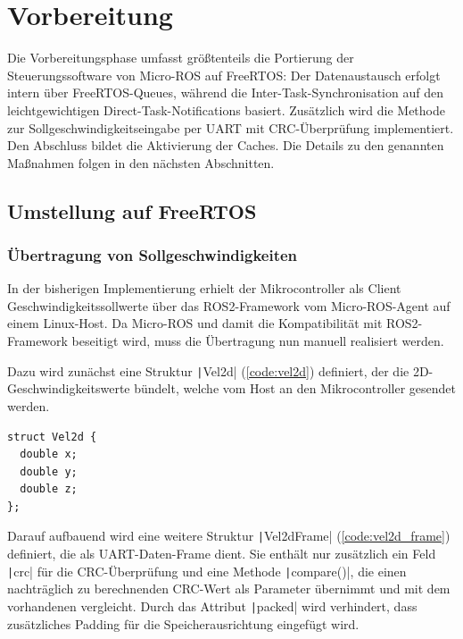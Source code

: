 \section{Vorbereitung}

Die Vorbereitungsphase umfasst größtenteils die Portierung der
Steuerungssoftware von Micro-ROS auf FreeRTOS: Der Datenaustausch erfolgt intern
über FreeRTOS-Queues, während die Inter-Task-Synchronisation auf den
leichtgewichtigen Direct-Task-Notifications basiert. Zusätzlich wird die Methode
zur Sollgeschwindigkeitseingabe per UART mit CRC-Überprüfung implementiert. Den
Abschluss bildet die Aktivierung der Caches. Die Details zu den genannten
Maßnahmen folgen in den nächsten Abschnitten.

\subsection{Umstellung auf FreeRTOS}

\subsubsection{Übertragung von Sollgeschwindigkeiten}

In der bisherigen Implementierung erhielt der Mikrocontroller als Client
Geschwindigkeitssollwerte über das ROS2-Framework vom Micro-ROS-Agent auf einem
Linux-Host. Da Micro-ROS und damit die Kompatibilität mit ROS2-Framework
beseitigt wird, muss die Übertragung nun manuell realisiert werden.

Dazu wird zunächst eine Struktur \texttt|Vel2d| (\ref{code:vel2d})
definiert, der die 2D-Geschwindigkeitswerte bündelt, welche vom Host an den
Mikrocontroller gesendet werden.

\begin{code}
\begin{verbatim}
struct Vel2d {
  double x;
  double y;
  double z;
};
\end{verbatim}
    \label{code:vel2d}
\end{code}

Darauf aufbauend wird eine weitere Struktur \texttt|Vel2dFrame|
(\ref{code:vel2d_frame}) definiert, die als UART-Daten-Frame dient. Sie enthält
nur zusätzlich ein Feld \texttt|crc| für die CRC-Überprüfung und eine
Methode \texttt|compare()|, die einen nachträglich zu berechnenden
CRC-Wert als Parameter übernimmt und mit dem vorhandenen vergleicht. Durch das
Attribut \texttt|packed| wird verhindert, dass zusätzliches Padding für
die Speicherausrichtung eingefügt wird.

